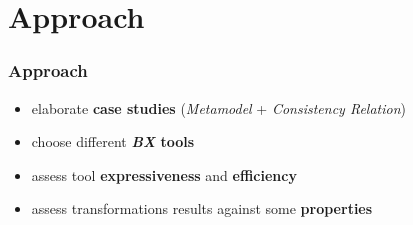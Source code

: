 \documentclass{beamer}
\begin{document}
\section{Approach}
\begin{frame}
\frametitle{Approach}

\begin{itemize}

\item elaborate \textbf{case studies} {\small (\textit{Metamodel} + \textit{Consistency Relation})}
 
\item choose different \textbf{\textit{BX} tools }

\item assess tool \textbf{expressiveness} and \textbf{efficiency}

\item assess transformations results against some \textbf{properties}


\end{itemize}

\end{frame}


\end{document}
